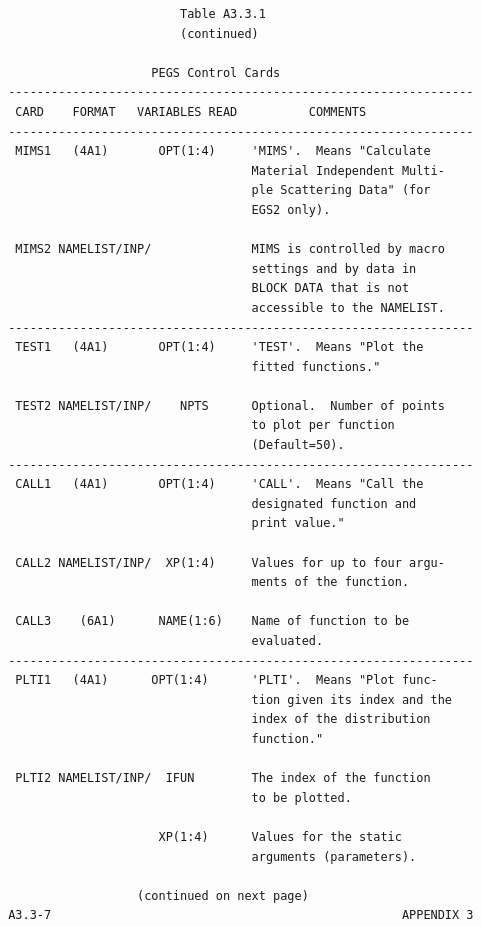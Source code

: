 \newpage {} \begin{verbatim}
                         Table A3.3.1
                         (continued)
 
                     PEGS Control Cards
 -----------------------------------------------------------------
  CARD    FORMAT   VARIABLES READ          COMMENTS
 -----------------------------------------------------------------
  MIMS1   (4A1)       OPT(1:4)     'MIMS'.  Means "Calculate
                                   Material Independent Multi-
                                   ple Scattering Data" (for
                                   EGS2 only).
 
  MIMS2 NAMELIST/INP/              MIMS is controlled by macro
                                   settings and by data in
                                   BLOCK DATA that is not
                                   accessible to the NAMELIST.
 -----------------------------------------------------------------
  TEST1   (4A1)       OPT(1:4)     'TEST'.  Means "Plot the
                                   fitted functions."
 
  TEST2 NAMELIST/INP/    NPTS      Optional.  Number of points
                                   to plot per function
                                   (Default=50).
 -----------------------------------------------------------------
  CALL1   (4A1)       OPT(1:4)     'CALL'.  Means "Call the
                                   designated function and
                                   print value."
 
  CALL2 NAMELIST/INP/  XP(1:4)     Values for up to four argu-
                                   ments of the function.
 
  CALL3    (6A1)      NAME(1:6)    Name of function to be
                                   evaluated.
 -----------------------------------------------------------------
  PLTI1   (4A1)      OPT(1:4)      'PLTI'.  Means "Plot func-
                                   tion given its index and the
                                   index of the distribution
                                   function."
 
  PLTI2 NAMELIST/INP/  IFUN        The index of the function
                                   to be plotted.
 
                      XP(1:4)      Values for the static
                                   arguments (parameters).
 
                   (continued on next page)
 A3.3-7                                                 APPENDIX 3
\end{verbatim} 
